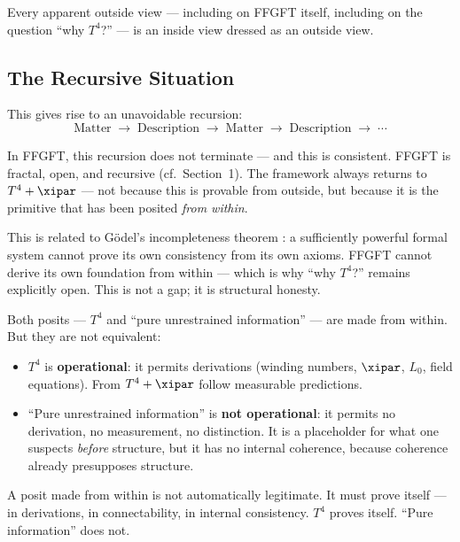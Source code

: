 Every apparent outside view --- including on FFGFT itself, including on the question ``why $T^4$?'' --- is an inside view dressed as an outside view.

\subsection{The Recursive Situation}

This gives rise to an unavoidable recursion:
\begin{equation}
  \text{Matter} \;\rightarrow\; \text{Description} \;\rightarrow\; \text{Matter} \;\rightarrow\; \text{Description} \;\rightarrow\; \cdots
\end{equation}

In FFGFT, this recursion does not terminate --- and this is consistent. FFGFT is fractal, open, and recursive (cf.\ Section~1). The framework always returns to $T^4 + \xipar$ --- not because this is provable from outside, but because it is the primitive that has been posited \emph{from within}.

\begin{keyresult}
This is related to Gödel's incompleteness theorem \cite{Goedel1931}: a sufficiently powerful formal system cannot prove its own consistency from its own axioms. FFGFT cannot derive its own foundation from within --- which is why ``why $T^4$?'' remains explicitly open. This is not a gap; it is structural honesty.
\end{keyresult}

\begin{wichtig}
Both posits --- $T^4$ and ``pure unrestrained information'' --- are made from within. But they are not equivalent:
\begin{itemize}
  \item $T^4$ is \textbf{operational}: it permits derivations (winding numbers, $\xipar$, $L_0$, field equations). From $T^4 + \xipar$ follow measurable predictions.
  \item ``Pure unrestrained information'' is \textbf{not operational}: it permits no derivation, no measurement, no distinction. It is a placeholder for what one suspects \emph{before} structure, but it has no internal coherence, because coherence already presupposes structure.
\end{itemize}
A posit made from within is not automatically legitimate. It must prove itself --- in derivations, in connectability, in internal consistency. $T^4$ proves itself. ``Pure information'' does not.
\end{wichtig}

